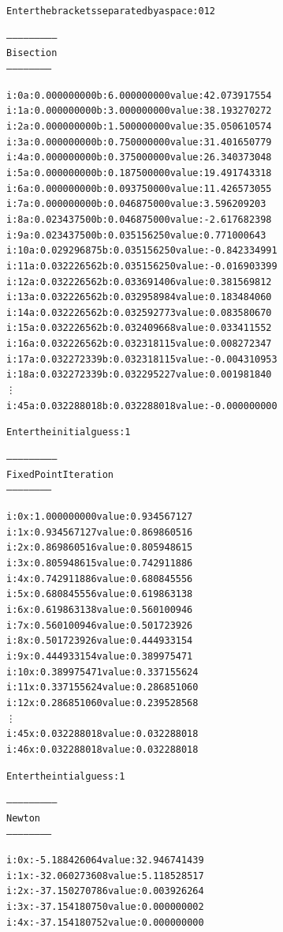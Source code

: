 \documentclass[11pt]{article} %
\begin{document}
\begin{alltt}
Enter the brackets separated by a space:  0 12

--------------------------
 Bisection
 -----------------------


i: 0	a: 0.000000000	b: 6.000000000	value: 42.073917554 
i: 1	a: 0.000000000	b: 3.000000000	value: 38.193270272 
i: 2	a: 0.000000000	b: 1.500000000	value: 35.050610574 
i: 3	a: 0.000000000	b: 0.750000000	value: 31.401650779 
i: 4	a: 0.000000000	b: 0.375000000	value: 26.340373048 
i: 5	a: 0.000000000	b: 0.187500000	value: 19.491743318 
i: 6	a: 0.000000000	b: 0.093750000	value: 11.426573055 
i: 7	a: 0.000000000	b: 0.046875000	value: 3.596209203 
i: 8	a: 0.023437500	b: 0.046875000	value: -2.617682398 
i: 9	a: 0.023437500	b: 0.035156250	value: 0.771000643 
i: 10	a: 0.029296875	b: 0.035156250	value: -0.842334991 
i: 11	a: 0.032226562	b: 0.035156250	value: -0.016903399 
i: 12	a: 0.032226562	b: 0.033691406	value: 0.381569812 
i: 13	a: 0.032226562	b: 0.032958984	value: 0.183484060 
i: 14	a: 0.032226562	b: 0.032592773	value: 0.083580670 
i: 15	a: 0.032226562	b: 0.032409668	value: 0.033411552 
i: 16	a: 0.032226562	b: 0.032318115	value: 0.008272347 
i: 17	a: 0.032272339	b: 0.032318115	value: -0.004310953 
i: 18	a: 0.032272339	b: 0.032295227	value: 0.001981840 
\vdots
i: 45	a: 0.032288018	b: 0.032288018	value: -0.000000000 


Enter the initial guess: 1 

--------------------------
 Fixed Point Iteration
 -----------------------


i: 0	x: 1.000000000	value: 0.934567127
i: 1	x: 0.934567127	value: 0.869860516
i: 2	x: 0.869860516	value: 0.805948615
i: 3	x: 0.805948615	value: 0.742911886
i: 4	x: 0.742911886	value: 0.680845556
i: 5	x: 0.680845556	value: 0.619863138
i: 6	x: 0.619863138	value: 0.560100946
i: 7	x: 0.560100946	value: 0.501723926
i: 8	x: 0.501723926	value: 0.444933154
i: 9	x: 0.444933154	value: 0.389975471
i: 10	x: 0.389975471	value: 0.337155624
i: 11	x: 0.337155624	value: 0.286851060
i: 12	x: 0.286851060	value: 0.239528568
\vdots
i: 45	x: 0.032288018	value: 0.032288018
i: 46	x: 0.032288018	value: 0.032288018

Enter the intial guess: 1

--------------------------
 Newton
 -----------------------


i: 0	x: -5.188426064	value: 32.946741439
i: 1	x: -32.060273608	value: 5.118528517
i: 2	x: -37.150270786	value: 0.003926264
i: 3	x: -37.154180750	value: 0.000000002
i: 4	x: -37.154180752	value: 0.000000000

\end{alltt}
\end{document}
